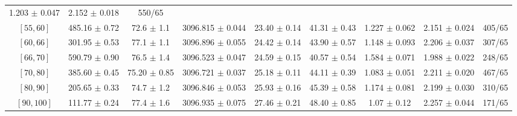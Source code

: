\begin{tabular}{c||c|c|c|c|c|c|c||c}
1.203 $\pm$ 0.047 & 
2.152 $\pm$ 0.018 & 
550/65\\
$[55, 60]$ & 485.16 $\pm$ 0.72 & 
72.6 $\pm$ 1.1 & 
3096.815 $\pm$ 0.044 & 
23.40 $\pm$ 0.14 & 
41.31 $\pm$ 0.43 & 
1.227 $\pm$ 0.062 & 
2.151 $\pm$ 0.024 & 
405/65\\
$[60, 66]$ & 301.95 $\pm$ 0.53 & 
77.1 $\pm$ 1.1 & 
3096.896 $\pm$ 0.055 & 
24.42 $\pm$ 0.14 & 
43.90 $\pm$ 0.57 & 
1.148 $\pm$ 0.093 & 
2.206 $\pm$ 0.037 & 
307/65\\
$[66, 70]$ & 590.79 $\pm$ 0.90 & 
76.5 $\pm$ 1.4 & 
3096.523 $\pm$ 0.047 & 
24.59 $\pm$ 0.15 & 
40.57 $\pm$ 0.54 & 
1.584 $\pm$ 0.071 & 
1.988 $\pm$ 0.022 & 
248/65\\
$[70, 80]$ & 385.60 $\pm$ 0.45 & 
75.20 $\pm$ 0.85 & 
3096.721 $\pm$ 0.037 & 
25.18 $\pm$ 0.11 & 
44.11 $\pm$ 0.39 & 
1.083 $\pm$ 0.051 & 
2.211 $\pm$ 0.020 & 
467/65\\
$[80, 90]$ & 205.65 $\pm$ 0.33 & 
74.7 $\pm$ 1.2 & 
3096.846 $\pm$ 0.053 & 
25.93 $\pm$ 0.16 & 
45.39 $\pm$ 0.58 & 
1.174 $\pm$ 0.081 & 
2.199 $\pm$ 0.030 & 
310/65\\
$[90, 100]$ & 111.77 $\pm$ 0.24 & 
77.4 $\pm$ 1.6 & 
3096.935 $\pm$ 0.075 & 
27.46 $\pm$ 0.21 & 
48.40 $\pm$ 0.85 & 
1.07 $\pm$ 0.12 & 
2.257 $\pm$ 0.044 & 
171/65\\
\end{tabular}
